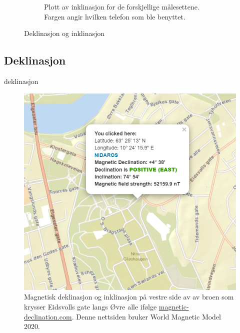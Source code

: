 \begin{figure}
\begin{subfigure}{.5\textwidth}
    \caption{Plott av inklinasjon for de forskjellige målesettene. \\
    Fargen angir hvilken telefon som ble benyttet.}
    \label{fig:plot_inklination}
\end{subfigure}
    \caption{Deklinasjon og inklinasjon}
    \label{Ink_og_dek}
\end{figure}


\subsection{Deklinasjon}

{deklinasjon}

\begin{figure}
    \centering
    \includegraphics{img/WMM.png}
    \caption{Magnetisk deklinasjon og inklinasjon på vestre side av av broen som krysser Eidsvolls gate langs Øvre alle ifølge \href{https://www.magnetic-declination.com/}{magnetic-declination.com}. Denne nettsiden bruker World Magnetic Model 2020. \cite{magnetic_declination}}
    \label{fig:WMM}
\end{figure}
